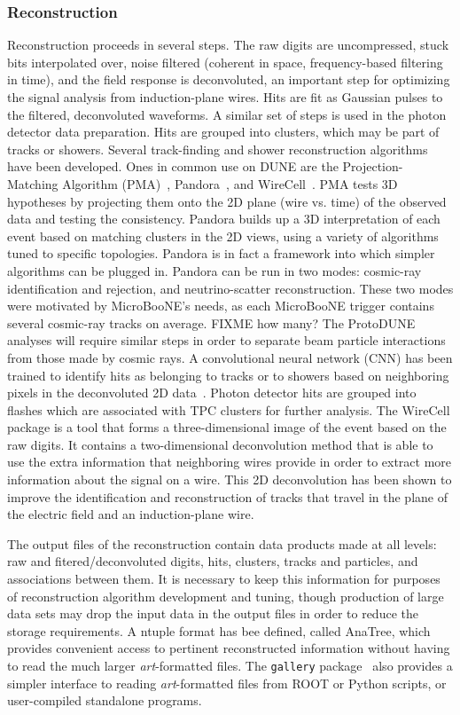 \subsubsection{Reconstruction}

Reconstruction proceeds in several steps.  The raw digits are uncompressed, stuck bits interpolated over,
noise filtered (coherent in space, frequency-based filtering in time), and the field response is deconvoluted,
an important step for optimizing the signal analysis from induction-plane wires.  Hits are fit as Gaussian
pulses to the filtered, deconvoluted waveforms.  A similar set of steps is used in the photon detector data
preparation.  Hits are grouped into clusters, which may be part of tracks or showers.  Several track-finding
and shower reconstruction algorithms have been developed.  Ones in common use on DUNE are the Projection-Matching
Algorithm (PMA)~\cite{PMA}, Pandora~\cite{Pandora}, and WireCell~\cite{wirecell}.  
PMA tests 3D hypotheses by projecting them onto the  2D plane (wire vs. time) of the observed data and 
testing the consistency.  Pandora builds up a 3D interpretation
of each event based on matching clusters in the 2D views, using a variety of algorithms tuned to specific topologies.
Pandora is in fact a framework into which simpler algorithms can be plugged in.  Pandora can be run in two modes:
cosmic-ray identification and rejection, and neutrino-scatter reconstruction.  These two modes were motivated by
MicroBooNE's needs, as each MicroBooNE trigger contains several cosmic-ray tracks on average.  FIXME how many?
The ProtoDUNE analyses will require similar steps in order to separate beam particle interactions from those
made by cosmic rays.  A convolutional neural network (CNN)
has been trained to identify hits as belonging to tracks or to showers based on neighboring pixels in the 
deconvoluted 2D data~\cite{CNN}.  Photon detector hits are grouped into flashes which are associated with
TPC clusters for further analysis.  The WireCell package is a tool that forms a three-dimensional image of the
event based on the raw digits.  It contains a two-dimensional deconvolution method that is able to use
the extra information that neighboring wires provide in order to extract more information about the signal on
a wire.  This 2D deconvolution has been shown to improve the identification and reconstruction of tracks that
travel in the plane of the electric field and an induction-plane wire.


The output files of the reconstruction contain data products made at all levels: raw and fitered/deconvoluted
digits, hits, clusters, tracks and particles, and associations between them.  It is necessary to keep this information
for purposes of reconstruction algorithm development and tuning, though production of large data sets may
drop the input data in the output files in order to reduce the storage requirements.  A ntuple format has bee
defined, called AnaTree, which provides convenient access to pertinent reconstructed information without
having to read the much larger {\it art}-formatted files.  The {\tt gallery} package~\cite{gallery} also provides
a simpler interface to reading {\it art}-formatted files from ROOT or Python scripts, or user-compiled standalone
programs.

